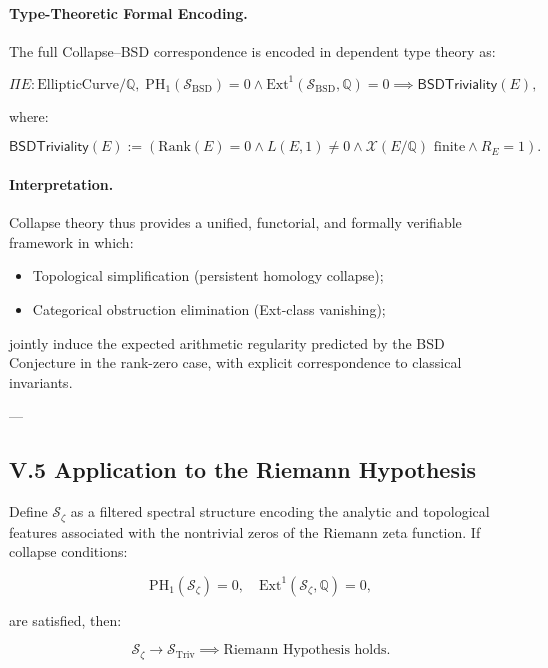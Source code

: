 \documentclass[11pt]{article}
\newcommand{\Sha}{\mathcal{X}}
\begin{document}
\paragraph{Type-Theoretic Formal Encoding.}

The full Collapse--BSD correspondence is encoded in dependent type theory as:

\[
\Pi E : \mathrm{EllipticCurve}/\mathbb{Q},\;
\mathrm{PH}_1(\mathcal{S}_{\mathrm{BSD}}) = 0 \wedge \mathrm{Ext}^1(\mathcal{S}_{\mathrm{BSD}}, \mathbb{Q}) = 0
\implies
\mathsf{BSDTriviality}(E),
\]

where:

\[
\mathsf{BSDTriviality}(E) := \left( \mathrm{Rank}(E) = 0 \wedge L(E, 1) \neq 0 \wedge \Sha(E/\mathbb{Q}) \text{ finite} \wedge R_E = 1 \right).
\]

\paragraph{Interpretation.}

Collapse theory thus provides a unified, functorial, and formally verifiable framework in which:

\begin{itemize}
    \item Topological simplification (persistent homology collapse);
    \item Categorical obstruction elimination (Ext-class vanishing);
\end{itemize}

jointly induce the expected arithmetic regularity predicted by the BSD Conjecture in the rank-zero case, with explicit correspondence to classical invariants.

---

\subsection*{V.5 Application to the Riemann Hypothesis}

Define $\mathcal{S}_{\zeta}$ as a filtered spectral structure encoding the analytic and topological features associated with the nontrivial zeros of the Riemann zeta function.  
If collapse conditions:

\[
\mathrm{PH}_1(\mathcal{S}_{\zeta}) = 0, \quad \mathrm{Ext}^1(\mathcal{S}_{\zeta}, \mathbb{Q}) = 0,
\]

are satisfied, then:

\[
\mathcal{S}_{\zeta} \longrightarrow \mathcal{S}_{\mathrm{Triv}} \implies \text{Riemann Hypothesis holds}.
\]
\end{document}
